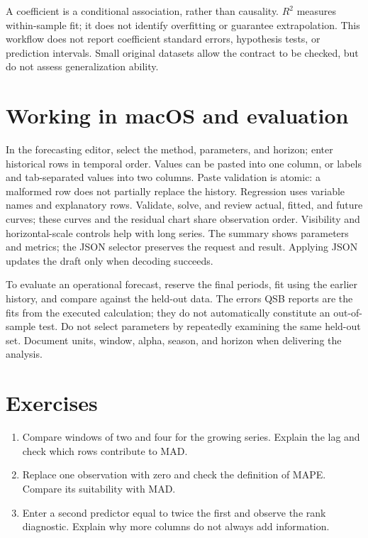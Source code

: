 A coefficient is a conditional association, rather than causality. \(R^2\)
measures within-sample fit; it does not identify overfitting or guarantee
extrapolation. This workflow does not report coefficient standard errors,
hypothesis tests, or prediction intervals. Small original datasets allow the
contract to be checked, but do not assess generalization ability.

\section{Working in macOS and evaluation}
In the forecasting editor, select the method, parameters, and horizon; enter
historical rows in temporal order. Values can be pasted into one column, or
labels and tab-separated values into two columns. Paste validation is atomic:
a malformed row does not partially replace the history. Regression uses
variable names and explanatory rows. Validate, solve, and review actual,
fitted, and future curves; these curves and the residual chart share observation
order. Visibility and horizontal-scale controls help with long series. The
summary shows parameters and metrics; the JSON selector preserves the request
and result. Applying JSON updates the draft only when decoding succeeds.

To evaluate an operational forecast, reserve the final periods, fit using the
earlier history, and compare against the held-out data. The errors QSB reports
are the fits from the executed calculation; they do not automatically constitute
an out-of-sample test. Do not select parameters by repeatedly examining the
same held-out set. Document units, window, alpha, season, and horizon when
delivering the analysis.

\section{Exercises}
\begin{enumerate}
\item Compare windows of two and four for the growing series. Explain the lag
and check which rows contribute to MAD.
\item Replace one observation with zero and check the definition of MAPE.
Compare its suitability with MAD.
\item Enter a second predictor equal to twice the first and observe the rank
diagnostic. Explain why more columns do not always add information.
\end{enumerate}
